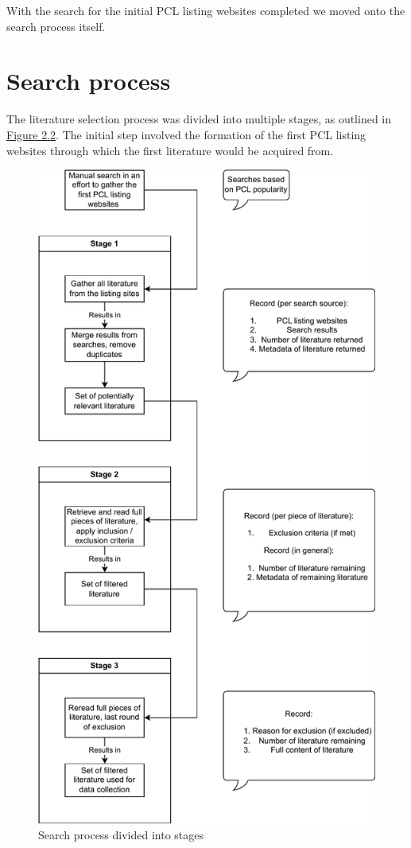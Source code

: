 With the search for the initial PCL listing websites completed we moved onto the search process itself.

\section{Search process}
The literature selection process was divided into multiple stages, as outlined in \hyperref[fig:search-process]{Figure 2.2}. The initial step involved the formation of the first PCL listing websites through which the first literature would be acquired from.

\begin{figure}
	\centering
	\includegraphics[scale=0.67]{figures/search-process.pdf}
	\caption{Search process divided into stages}
	\label{fig:search-process}
\end{figure}

